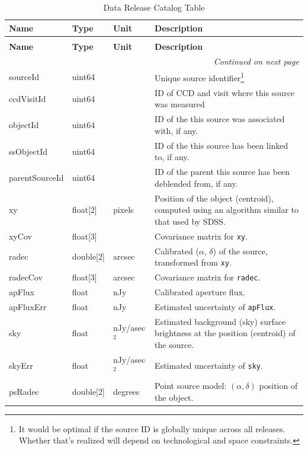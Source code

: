 \documentclass[SE,lsstdraft,toc]{lsstdoc}
\newenvironment{schema}[3]{%
\setlength\LTleft{0pt}
\setlength\LTright{\fill}
\begin{longtable}{p{0.2\textwidth}p{0.14\textwidth}p{0.14\textwidth}p{0.41\textwidth}}

\caption[#1]{#2\label{#3}}\\

\hline \textbf{Name} & \textbf{Type} & \textbf{Unit} & \textbf{Description}\\ \hline
\endfirsthead

\caption[#1]{#2}\\

\hline \textbf{Name} & \textbf{Type} & \textbf{Unit} & \textbf{Description}\\ \hline
\endhead

\hline \multicolumn{4}{r}{\emph{Continued on next page}} \\
\endfoot

\hline\hline
\endlastfoot
}{%
\hline
\end{longtable}
}
\begin{document}
\begin{schema}{\Source Table}{Data Release Catalog \Source Table}{tbl:sourceTable}

sourceId & uint64 & ~ & Unique source identifier\footnote{It would be optimal if the source ID is globally unique across all releases. Whether that's realized will depend on technological and space constraints.} \\

ccdVisitId & uint64 & ~ & ID of CCD and visit where this source was measured \\

objectId & uint64 & ~ & ID of the \Object this source was associated with, if any. \\

ssObjectId & uint64 & ~ & ID of the \SSObject this source has been linked to, if any. \\

parentSourceId & uint64 & ~ & ID of the parent \Source this source has been deblended from, if any. \\

xy & float[2] & pixels & Position of the object (centroid), computed using an algorithm similar to that used by SDSS.\\

xyCov & float[3] & ~ & Covariance matrix for \texttt{xy}. \\

radec & double[2] & arcsec & Calibrated ($\alpha$, $\delta$) of the source, transformed from \texttt{xy}.\\

radecCov & float[3] & arcsec & Covariance matrix for \texttt{radec}. \\

apFlux & float & nJy & Calibrated aperture flux. \\

apFluxErr & float & nJy &  Estimated uncertainty of \texttt{apFlux}. \\

sky & float & nJy/asec$^{2}$ & Estimated background (sky) surface brightness at the position (centroid) of the source. \\

skyErr & float & nJy/asec$^{2}$ & Estimated uncertainty of \texttt{sky}. \\

psRadec & double[2] & degrees & Point source model: $(\alpha, \delta)$ position of the object. \\


\end{schema}
\end{document}
